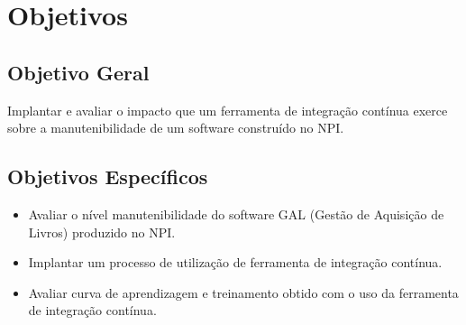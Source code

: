 \chapter{Objetivos}\label{objetivos}
\section{Objetivo Geral}\label{objetivoger}
Implantar e avaliar o impacto que um ferramenta de integração contínua exerce sobre a manutenibilidade de um software construído no NPI.

\section{Objetivos Específicos}

\begin{itemize}
\item Avaliar o nível manutenibilidade do software GAL (Gestão de Aquisição de Livros) produzido no NPI.
\item Implantar um processo de utilização de ferramenta de integração contínua.
\item Avaliar curva de aprendizagem e treinamento obtido com o uso da ferramenta de integração contínua.
\end{itemize}